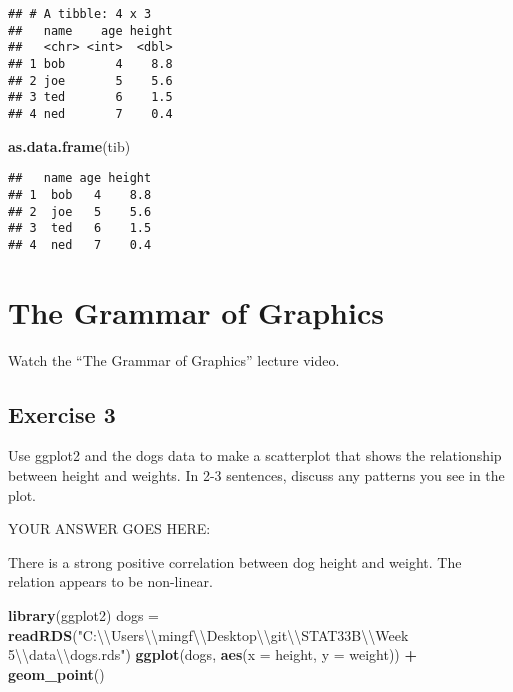 \documentclass[
]{article}
\newenvironment{Shaded}{\begin{snugshade}}{\end{snugshade}}
\newcommand{\CharTok}[1]{\textcolor[rgb]{0.31,0.60,0.02}{#1}}
\newcommand{\DataTypeTok}[1]{\textcolor[rgb]{0.13,0.29,0.53}{#1}}
\newcommand{\KeywordTok}[1]{\textcolor[rgb]{0.13,0.29,0.53}{\textbf{#1}}}
\newcommand{\NormalTok}[1]{#1}
\newcommand{\OperatorTok}[1]{\textcolor[rgb]{0.81,0.36,0.00}{\textbf{#1}}}
\newcommand{\StringTok}[1]{\textcolor[rgb]{0.31,0.60,0.02}{#1}}
\begin{document}
\begin{verbatim}
## # A tibble: 4 x 3
##   name    age height
##   <chr> <int>  <dbl>
## 1 bob       4    8.8
## 2 joe       5    5.6
## 3 ted       6    1.5
## 4 ned       7    0.4
\end{verbatim}

\begin{Shaded}
\begin{Highlighting}[]
\KeywordTok{as.data.frame}\NormalTok{(tib)}
\end{Highlighting}
\end{Shaded}

\begin{verbatim}
##   name age height
## 1  bob   4    8.8
## 2  joe   5    5.6
## 3  ted   6    1.5
## 4  ned   7    0.4
\end{verbatim}

\hypertarget{the-grammar-of-graphics}{%
\section{The Grammar of Graphics}\label{the-grammar-of-graphics}}

Watch the ``The Grammar of Graphics'' lecture video.

\hypertarget{exercise-3}{%
\subsection{Exercise 3}\label{exercise-3}}

Use ggplot2 and the dogs data to make a scatterplot that shows the
relationship between height and weights. In 2-3 sentences, discuss any
patterns you see in the plot.

YOUR ANSWER GOES HERE:

There is a strong positive correlation between dog height and weight.
The relation appears to be non-linear.

\begin{Shaded}
\begin{Highlighting}[]
\KeywordTok{library}\NormalTok{(ggplot2)}
\NormalTok{dogs =}\StringTok{ }\KeywordTok{readRDS}\NormalTok{(}\StringTok{"C:}\CharTok{\textbackslash{}\textbackslash{}}\StringTok{Users}\CharTok{\textbackslash{}\textbackslash{}}\StringTok{mingf}\CharTok{\textbackslash{}\textbackslash{}}\StringTok{Desktop}\CharTok{\textbackslash{}\textbackslash{}}\StringTok{git}\CharTok{\textbackslash{}\textbackslash{}}\StringTok{STAT33B}\CharTok{\textbackslash{}\textbackslash{}}\StringTok{Week 5}\CharTok{\textbackslash{}\textbackslash{}}\StringTok{data}\CharTok{\textbackslash{}\textbackslash{}}\StringTok{dogs.rds"}\NormalTok{)}
\KeywordTok{ggplot}\NormalTok{(dogs, }\KeywordTok{aes}\NormalTok{(}\DataTypeTok{x =}\NormalTok{ height, }\DataTypeTok{y =}\NormalTok{ weight)) }\OperatorTok{+}\StringTok{ }\KeywordTok{geom\_point}\NormalTok{()}
\end{Highlighting}
\end{Shaded}
\end{document}
